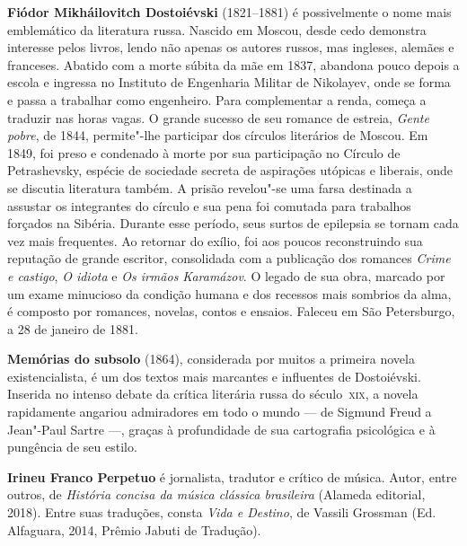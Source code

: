 \textbf{Fiódor Mikháilovitch Dostoiévski} (1821--1881) é possivelmente o nome mais emblemático
da literatura russa. Nascido em Moscou, desde cedo demonstra interesse pelos livros, lendo não apenas os autores russos,
mas ingleses, alemães e franceses. Abatido com a morte súbita da mãe em 1837, abandona pouco depois a escola e ingressa 
no Instituto de Engenharia Militar de Nikolayev, onde se forma e passa a trabalhar como engenheiro. 
Para complementar a renda, começa a traduzir nas horas vagas. O grande sucesso de seu romance de estreia, \textit{Gente pobre}, 
de 1844, permite"-lhe participar dos círculos literários de Moscou. Em 1849, foi
preso e condenado à morte por sua participação no Círculo de Petrashevsky, 
espécie de sociedade secreta de aspirações utópicas e liberais, onde se discutia literatura também. 
A prisão revelou"-se uma farsa destinada a assustar os integrantes do círculo e sua pena foi comutada para 
trabalhos forçados na Sibéria. Durante esse período, seus surtos de epilepsia se tornam cada vez mais
frequentes. Ao retornar do exílio, foi aos poucos reconstruindo sua reputação de grande escritor, consolidada com a
publicação dos romances \textit{Crime e castigo}, \textit{O idiota} e \textit{Os irmãos Karamázov}. 
O legado de sua obra, marcado por um exame minucioso da condição humana e dos recessos mais sombrios da alma,
é composto por romances, novelas, contos e ensaios. Faleceu em São Petersburgo, a 28 de janeiro de 1881.

\textbf{Memórias do subsolo} (1864), considerada por muitos a primeira
novela existencialista, é um dos textos mais marcantes e influentes de Dostoiévski. 
Inserida no intenso debate da crítica literária russa do século~\textsc{xix}, a novela 
rapidamente angariou admiradores em todo o mundo --- de Sigmund Freud a Jean"-Paul Sartre ---,
graças à profundidade de sua cartografia psicológica e à pungência de seu estilo.


\textbf{Irineu Franco Perpetuo} é jornalista, tradutor e crítico de música. Autor, entre outros, de \textit{História concisa da música clássica brasileira} (Alameda editorial, 2018). Entre suas traduções, consta \textit{Vida e Destino}, de Vassili Grossman (Ed. Alfaguara, 2014, Prêmio Jabuti de Tradução).







